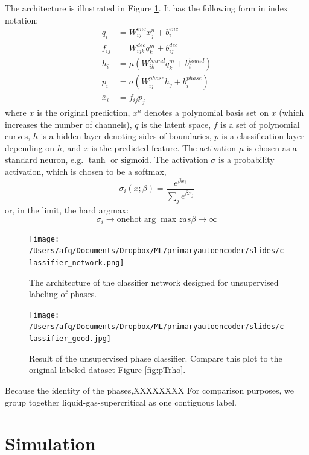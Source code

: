 \documentclass[]{article}
\begin{document}
The architecture is illustrated in Figure \ref{fig:classifyingnetwork}.
It has the following form in index notation:
\begin{align}
  q_i &= W^{enc}_{ij} x^n_j + b^{enc}_i\\
  f_{ij} &= W^{dec}_{ijk} q^m_k + b^{dec}_{ij} \\
  h_i &= \mu\left(W^{bound}_{ik}q^m_k+b^{bound}_{i}\right) \\
  p_i &= \sigma\left(W^{phase}_{ij}h_j+b^{phase}_i\right) \\
  \bar{x}_i&= f_{ij} p_j
\end{align}
where $x$ is the original prediction, $x^n$ denotes a polynomial basis
set on $x$ (which increases the number of channels), $q$ is the latent
space, $f$ is a set of polynomial curves, $h$ is a hidden layer
denoting sides of boundaries, $p$ is a classification layer depending
on $h$, and $\bar{x}$ is the predicted feature. The activation $\mu$
is chosen as a standard neuron, e.g. $\tanh$ or $\text{sigmoid}$. The
activation $\sigma$ is a probability activation, which is chosen to be
a softmax,
\begin{equation}
\sigma_i(x;\beta) = \frac{e^{\beta x_i}}{\sum_j e^{\beta x_j}}
\end{equation}
or, in the limit, the hard argmax:
\begin{equation}
\sigma_i \rightarrow \text{onehot}\arg\max z as  \beta\rightarrow\infty
\end{equation}

\begin{figure}
\centering
\texttt{[image: /Users/afq/Documents/Dropbox/ML/primaryautoencoder/slides/classifier\_network.png]}
\caption{\label{fig:classifyingnetwork}The architecture of the classifier network designed for
  unsupervised labeling of phases.}
\end{figure}

\begin{figure}
  \centering
  \texttt{[image: /Users/afq/Documents/Dropbox/ML/primaryautoencoder/slides/classifier\_good.jpg]}
  \caption{\label{fig:classified}Result of the unsupervised phase classifier. Compare this plot to the original labeled dataset Figure \ref{fig:pTrho}.}
\end{figure}
Because the identity of the phases,XXXXXXXX
For comparison purposes, we group together liquid-gas-supercritical as one contiguous label.

\hypertarget{header-n3321}{%
\section{Simulation}\label{header-n3321}}
\end{document}
